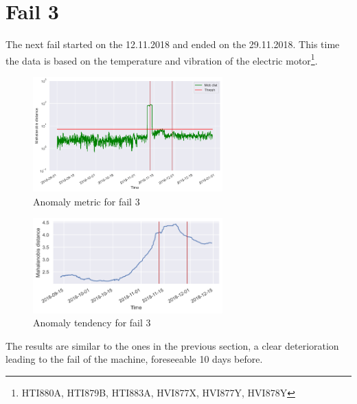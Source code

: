 \documentclass[11pt,twoside]{article}
\begin{document}
\section{Fail 3}
The next fail started on the 12.11.2018 and ended on the 29.11.2018. This time the data is based
on the temperature and vibration of the electric motor\footnote{HTI880A, HTI879B, HTI883A, HVI877X, HVI877Y, HVI878Y}.
\begin{figure}[h!]
\centering
\includegraphics[width=0.65\textwidth]{7_3_AM_label.png}
\caption{Anomaly metric for fail 3}\label{screenshots}
\end{figure}
\begin{figure}[h!]
\centering
\includegraphics[width=0.65\textwidth]{7_3_T_label.png}
\caption{Anomaly tendency for fail 3}\label{screenshots}
\end{figure}
\newpage
The results are similar to the ones in the previous section, a clear deterioration leading to the 
fail of the machine, foreseeable 10 days before.
\end{document}

